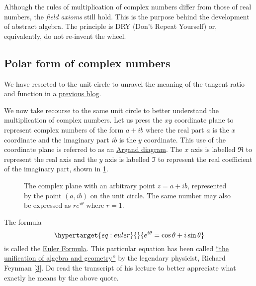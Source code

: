 \documentclass[
  a4paper,
]{article}
\begin{document}
Although the rules of multiplication of complex numbers differ from
those of real numbers, the \emph{field axioms} still hold. This is the
purpose behind the development of abstract algebra. The principle is DRY
(Don't Repeat Yourself) or, equivalently, do not re-invent the wheel.

\hypertarget{polar-form-of-complex-numbers}{%
\subsection{Polar form of complex
numbers}\label{polar-form-of-complex-numbers}}

We have resorted to the unit circle to unravel the meaning of the
tangent ratio and function in a
\href{https://swanlotus.netlify.app/blogs/a-tale-of-two-measures-degrees-and-radians}{previous
blog}.

We now take recourse to the same unit circle to better understand the
multiplication of complex numbers. Let us press the \(xy\) coordinate
plane to represent complex numbers of the form \(a + ib\) where the real
part \(a\) is the \(x\) coordinate and the imaginary part \(ib\) is the
\(y\) coordinate. This use of the coordinate plane is referred to as an
\href{https://en.wikipedia.org/wiki/Complex_plane\#Argand_diagram}{Argand
diagram}. The \(x\) axis is labelled \(\Re\) to represent the real axis
and the \(y\) axis is labelled \(\Im\) to represent the real coefficient
of the imaginary part, shown in \cref{fig:complex-unit-circle}.

\begin{figure}
\hypertarget{fig:complex-unit-circle}{%
\centering

\caption{The complex plane with an arbitrary point \(z = a + ib\),
represented by the point \((a, ib)\) on the unit circle. The same number
may also be expressed as \(re^{i\theta}\) where
\(r=1\).}\label{fig:complex-unit-circle}
}
\end{figure}

The formula \begin{equation}\protect\hypertarget{eq:euler}{}{
e^{i\theta} = \cos\theta + i \sin\theta
}\label{eq:euler}\end{equation} is called the
\href{https://en.wikipedia.org/wiki/Euler\%27s_formula}{Euler Formula}.
This particular equation has been called
\href{https://www.feynmanlectures.caltech.edu/I_22.html}{``the
unification of algebra and geometry''} by the legendary physicist,
Richard Feynman {[}\protect\hyperlink{ref-feynman22}{3}{]}. Do read the
transcript of his lecture to better appreciate what exactly he means by
the above quote.
\end{document}

